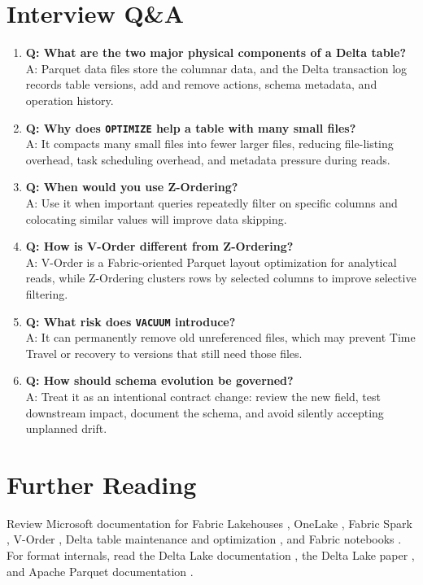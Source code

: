 \section{Interview Q\&A}
\begin{enumerate}
    \item \textbf{Q: What are the two major physical components of a Delta table?}\\
    A: Parquet data files store the columnar data, and the Delta transaction log records table versions, add and remove actions, schema metadata, and operation history.
    \item \textbf{Q: Why does \texttt{OPTIMIZE} help a table with many small files?}\\
    A: It compacts many small files into fewer larger files, reducing file-listing overhead, task scheduling overhead, and metadata pressure during reads.
    \item \textbf{Q: When would you use Z-Ordering?}\\
    A: Use it when important queries repeatedly filter on specific columns and colocating similar values will improve data skipping.
    \item \textbf{Q: How is V-Order different from Z-Ordering?}\\
    A: V-Order is a Fabric-oriented Parquet layout optimization for analytical reads, while Z-Ordering clusters rows by selected columns to improve selective filtering.
    \item \textbf{Q: What risk does \texttt{VACUUM} introduce?}\\
    A: It can permanently remove old unreferenced files, which may prevent Time Travel or recovery to versions that still need those files.
    \item \textbf{Q: How should schema evolution be governed?}\\
    A: Treat it as an intentional contract change: review the new field, test downstream impact, document the schema, and avoid silently accepting unplanned drift.
\end{enumerate}

\section{Further Reading}
Review Microsoft documentation for Fabric Lakehouses \cite{microsoftFabricLakehouse}, OneLake \cite{microsoftOneLakeOverview}, Fabric Spark \cite{microsoftFabricSparkCompute}, V-Order \cite{microsoftFabricVOrder}, Delta table maintenance and optimization \cite{microsoftFabricOptimize,microsoftFabricVacuum}, and Fabric notebooks \cite{microsoftFabricNotebooks}. For format internals, read the Delta Lake documentation \cite{deltaLakeDocs}, the Delta Lake paper \cite{armbrust2020delta}, and Apache Parquet documentation \cite{apacheParquet}.

